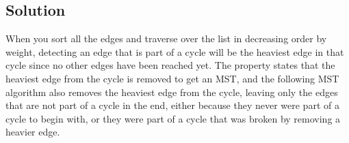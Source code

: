 \subsection*{Solution}

When you sort all the edges and traverse over the list in decreasing order by weight, detecting an edge that is part of a cycle will be the heaviest edge in that cycle since no other edges have been reached yet. The property states that the heaviest edge from the cycle is removed to get an MST, and the following MST algorithm also removes the heaviest edge from the cycle, leaving only the edges that are not part of a cycle in the end, either because they never were part of a cycle to begin with, or they were part of a cycle that was broken by removing a heavier edge.
